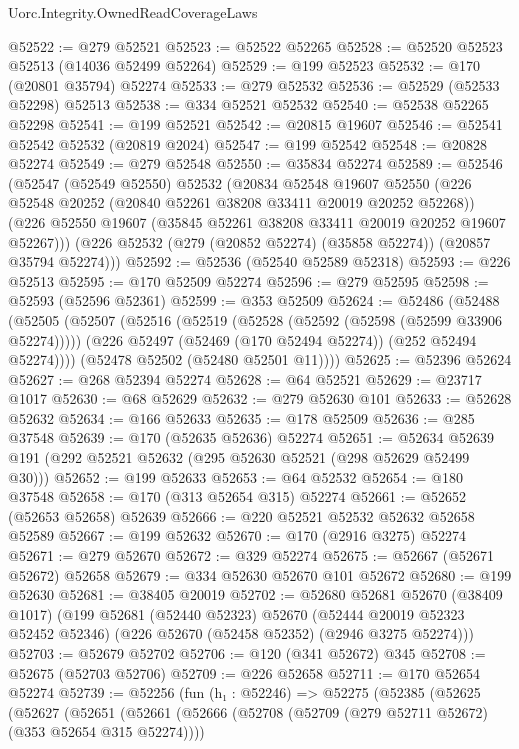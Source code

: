 \begin{lexlean}{Uorc.Integrity.OwnedReadCoverageLaws}
\begin{coremodule}
@52522 := @279 @52521
@52523 := @52522 @52265
@52528 := @52520 @52523 @52513 (@14036 @52499 @52264)
@52529 := @199 @52523
@52532 := @170 (@20801 @35794) @52274
@52533 := @279 @52532
@52536 := @52529 (@52533 @52298) @52513
@52538 := @334 @52521 @52532
@52540 := @52538 @52265 @52298
@52541 := @199 @52521
@52542 := @20815 @19607
@52546 := @52541 @52542 @52532 (@20819 @2024)
@52547 := @199 @52542
@52548 := @20828 @52274
@52549 := @279 @52548
@52550 := @35834 @52274
@52589 := @52546
    (@52547
      (@52549 @52550)
      @52532
      (@20834
        @52548
        @19607
        @52550
        (@226 @52548 @20252 (@20840 @52261 @38208 @33411 @20019 @20252 @52268))
        (@226 @52550 @19607 (@35845 @52261 @38208 @33411 @20019 @20252 @19607 @52267)))
      (@226 @52532 (@279 (@20852 @52274) (@35858 @52274)) (@20857 @35794 @52274)))
@52592 := @52536 (@52540 @52589 @52318)
@52593 := @226 @52513
@52595 := @170 @52509 @52274
@52596 := @279 @52595
@52598 := @52593 (@52596 @52361)
@52599 := @353 @52509
@52624 := @52486
    (@52488
      (@52505
        (@52507
          (@52516
            (@52519 (@52528 (@52592 (@52598 (@52599 @33906 @52274)))))
            (@226 @52497 (@52469 (@170 @52494 @52274)) (@252 @52494 @52274))))
        (@52478 @52502 (@52480 @52501 @11))))
@52625 := @52396 @52624
@52627 := @268 @52394 @52274
@52628 := @64 @52521
@52629 := @23717 @1017
@52630 := @68 @52629
@52632 := @279 @52630 @101
@52633 := @52628 @52632
@52634 := @166 @52633
@52635 := @178 @52509
@52636 := @285 @37548
@52639 := @170 (@52635 @52636) @52274
@52651 := @52634 @52639 @191 (@292 @52521 @52632 (@295 @52630 @52521 (@298 @52629 @52499 @30)))
@52652 := @199 @52633
@52653 := @64 @52532
@52654 := @180 @37548
@52658 := @170 (@313 @52654 @315) @52274
@52661 := @52652 (@52653 @52658) @52639
@52666 := @220 @52521 @52532 @52632 @52658 @52589
@52667 := @199 @52632
@52670 := @170 (@2916 @3275) @52274
@52671 := @279 @52670
@52672 := @329 @52274
@52675 := @52667 (@52671 @52672) @52658
@52679 := @334 @52630 @52670 @101 @52672
@52680 := @199 @52630
@52681 := @38405 @20019
@52702 := @52680
    @52681
    @52670
    (@38409 @1017)
    (@199
      @52681
      (@52440 @52323)
      @52670
      (@52444 @20019 @52323 @52452 @52346)
      (@226 @52670 (@52458 @52352) (@2946 @3275 @52274)))
@52703 := @52679 @52702
@52706 := @120 (@341 @52672) @345
@52708 := @52675 (@52703 @52706)
@52709 := @226 @52658
@52711 := @170 @52654 @52274
@52739 := @52256
    (fun (h₁ : @52246) =>
    @52275
      (@52385
        (@52625
          (@52627
            (@52651
              (@52661
                (@52666 (@52708 (@52709 (@279 @52711 @52672) (@353 @52654 @315 @52274))))

\end{coremodule}
\end{lexlean}
